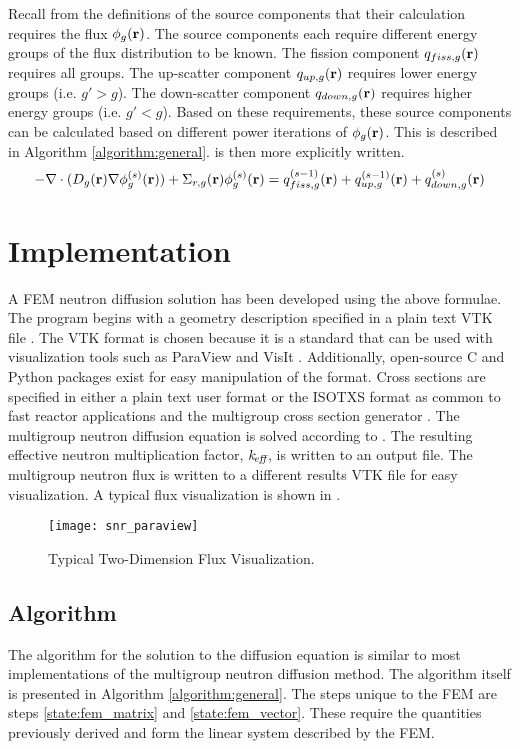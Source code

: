   Recall from the definitions of the source components that their calculation
  requires the flux $\phi_g(\mathbf{r})$. The source components each require
  different energy groups of the flux distribution to be known. The fission
  component $q_{fiss,g}(\mathbf{r})$ requires all groups. The up-scatter component
  $q_{up,g}(\mathbf{r})$ requires lower energy groups (i.e. $g' > g$). The
  down-scatter component $q_{down,g}(\mathbf{r})$ requires higher energy groups (i.e.
  $g' < g$). Based on these requirements, these source components can be
  calculated based on different power iterations of $\phi_g(\mathbf{r})$. This is
  described in Algorithm \ref{algorithm:general}.
   is then more explicitly written.
  \begin{equation} \label{eq:multigroup_power_iterations}
    -\mathbf{\nabla} \cdot (D_g(\mathbf{r}) \mathbf{\nabla} \phi_g^{(s)}(\mathbf{r})) + \Sigma_{r,g}(\mathbf{r})
    \phi_g^{(s)}(\mathbf{r}) = q_{fiss,g}^{(s-1)}(\mathbf{r}) + q_{up,g}^{(s-1)}(\mathbf{r}) +
    q_{down,g}^{(s)}(\mathbf{r})
  \end{equation}

\section{Implementation}
  A FEM neutron diffusion solution has been developed using 
  the above formulae. The program begins with a geometry description specified
  in a plain text VTK file \cite{vtk}. The VTK format is chosen because it is a
  standard that can be used with visualization tools such as ParaView
  \cite{ParaView} and VisIt \cite{VisIt}. Additionally, open-source C and Python
  packages exist for easy manipulation of the format. Cross sections are 
  specified in either a plain text user format or the ISOTXS format as common to 
  fast reactor applications and the multigroup cross section generator \mcc 
  \cite{mcc}. The multigroup neutron diffusion equation is solved according to 
  . The resulting effective neutron multiplication 
  factor, $k_{\!\mbox{\scriptsize \em eff}}$, is written to an output file. The multigroup neutron flux is
  written to a different results VTK file for easy visualization. A typical flux 
  visualization is shown in .

  \begin{figure}
    \centering
    \texttt{[image: snr\_paraview]}
    \caption{Typical Two-Dimension Flux Visualization.}
    \label{fig:snr_paraview}
  \end{figure}

  \subsection{Algorithm}
    The algorithm for the solution to the diffusion equation is similar to most
    implementations of the multigroup neutron diffusion method. The algorithm 
    itself is presented in Algorithm \ref{algorithm:general}. The steps unique 
    to the FEM are steps \ref{state:fem_matrix} and \ref{state:fem_vector}. 
    These require the quantities previously derived and form the linear system 
    described by the FEM. 
    
